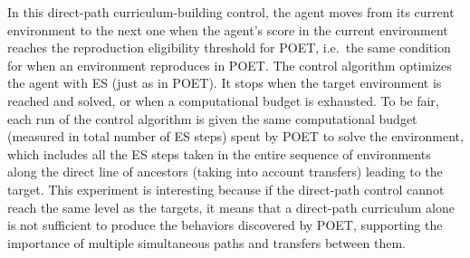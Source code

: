 \documentclass{article}
\newcommand{\jc}[1]{\comments{\textcolor{deepForestGreen}{[JC: #1]}}}
\newcommand{\ks}[1]{\comments{\textcolor{purple}{[Ken: #1]}}}
\newcommand{\rw}[1]{\comments{\textcolor{blue}{[Rui: #1]}}}
\newcommand{\comments}[1]{#1}
\begin{document}
In this direct-path curriculum-building control, the agent moves from its current environment to the next one when the agent's score in the current environment reaches the reproduction eligibility threshold for POET, i.e.\ the same condition for when an environment reproduces in POET. The control algorithm optimizes the agent with ES (just as in POET). It stops when the target environment is reached and solved, or when a computational budget is exhausted. To be fair, each run of the control algorithm is given the same computational budget (measured in total number of ES steps) spent by POET to solve the environment,
which includes all the ES steps taken in the entire sequence of environments along the direct line of ancestors (taking into account transfers) leading to the target. 
This experiment is interesting because if the direct-path control cannot reach the same level as the targets, it means that a direct-path curriculum alone is not sufficient to produce the behaviors discovered by POET, supporting the importance of multiple simultaneous paths and transfers between them.
\end{document}
